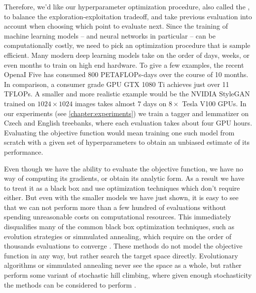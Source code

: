 Therefore, we'd like our hyperparameter optimization procedure, also called the
 , to balance the exploration-exploitation tradeoff, and take previous
evaluation into account when choosing which point to evaluate next. Since the
training of machine learning models -- and neural networks in particular -- can
be computationally costly, we need to pick an optimization procedure that is
sample efficient. Many modern deep learning models take on the order of days,
weeks, or even months to train on high end hardware. To give a few examples,
the recent OpenaI Five \citep{openai-five} has consumed $800$ PETAFLOPs-days
over the course of 10 months. In comparison, a consumer grade GPU GTX 1080 Ti
achieves just over 11 TFLOPs. A smaller and more realistic example would be the
NVIDIA StyleGAN \citep{nvidia-stylegan} trained on $1024\times1024$ images
takes almost $7$ days on $8\times$ Tesla V100 GPUs. In our experiments (see
\autoref{chapter:experiments}) we train a tagger and lemmatizer on Czech and
English treebanks, where each evaluation takes about four GPU hours. Evaluating
the objective function would mean training one such model from scratch with a
given set of hyperparameters to obtain an unbiased estimate of its performance.

Even though we have the ability to evaluate the objective function, we have no
way of computing its gradients, or obtain its analytic form. As a result we
have to treat it as a black box and use optimization techniques which don't
require either. But even with the smaller models we have just shown, it is easy
to see that we can not perform more than a few hundred of evaluations without
spending unreasonable costs on computational resources. This immediately
disqualifies many of the common black box optimization techniques, such as
evolution strategies or simmulated annealing, which require on the order of
thousands evaluations to converge \citep{google-vizier}. These methods do not model the objective function in any way, but rather search the target space directly. Evolutionary algorithms or simmulated annealing never see the space as a whole, but rather perform some variant of stochastic hill climbing, where given enough stochasticity the methods can be considered to perform .

